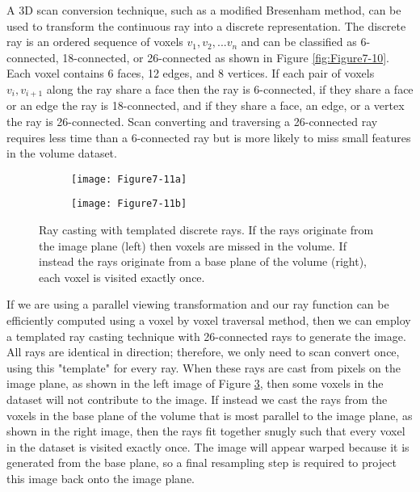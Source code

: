 A 3D scan conversion technique, such as a modified Bresenham method, can be used to transform the continuous ray into a discrete representation. The discrete ray is an ordered sequence of voxels $v_1, v_2,... v_n$ and can be classified as 6-connected, 18-connected, or 26-connected as shown in Figure \ref{fig:Figure7-10}. Each voxel contains 6 faces, 12 edges, and 8 vertices. If each pair of voxels  $v_i, v_{i+1}$ along the ray share a face then the ray is 6-connected, if they share a face or an edge the ray is 18-connected, and if they share a face, an edge, or a vertex the ray is 26-connected. Scan converting and traversing a 26-connected ray requires less time than a 6-connected ray but is more likely to miss small features in the volume dataset.

\begin{figure}[!htb]
	\begin{subfigure}[h]{0.48\linewidth}
		\texttt{[image: Figure7-11a]}
		\caption*{}\label{fig:Figure7-11a}
	\end{subfigure}
	\hfill
	\begin{subfigure}[h]{0.48\linewidth}
		\texttt{[image: Figure7-11b]}
		\caption*{}\label{fig:Figure7-11b}
	\end{subfigure}%
	\caption{Ray casting with templated discrete rays. If the rays originate from the image plane (left) then voxels are missed in the volume. If instead the rays originate from a base plane of the volume (right), each voxel is visited exactly once.}\label{fig:Figure7-11}
\end{figure}

If we are using a parallel viewing transformation and our ray function can be efficiently computed using a voxel by voxel traversal method, then we can employ a templated ray casting technique \cite{Yagel92b} with 26-connected rays to generate the image. All rays are identical in direction; therefore, we only need to scan convert once, using this "template" for every ray. When these rays are cast from pixels on the image plane, as shown in the left image of Figure \ref{fig:Figure7-11}, then some voxels in the dataset will not contribute to the image. If instead we cast the rays from the voxels in the base plane of the volume that is most parallel to the image plane, as shown in the right image, then the rays fit together snugly such that every voxel in the dataset is visited exactly once. The image will appear warped because it is generated from the base plane, so a final resampling step is required to project this image back onto the image plane.

